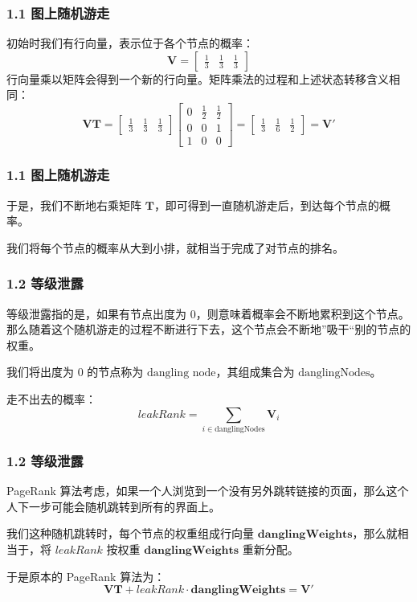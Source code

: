 \documentclass{beamer}
\begin{document}
\begin{frame}
	\frametitle{1.1 图上随机游走}
	初始时我们有行向量，表示位于各个节点的概率：
	\[
	\mathbf{V} = \begin{bmatrix}
		\frac{1}{3} & \frac{1}{3} & \frac{1}{3}
	\end{bmatrix}
	\]
	\pause
	行向量乘以矩阵会得到一个新的行向量。矩阵乘法的过程和上述状态转移含义相同：
	\[
	\mathbf{V}\mathbf{T}=
	\begin{bmatrix}
		\frac{1}{3} & \frac{1}{3} & \frac{1}{3}
	\end{bmatrix}
	\begin{bmatrix}
		0 & \frac{1}{2} & \frac{1}{2} \\
		0 & 0 & 1 \\
		1 & 0 & 0
	\end{bmatrix}
	= 
	\begin{bmatrix}
		\frac{1}{3} & \frac{1}{6} & \frac{1}{2}
	\end{bmatrix}
	=\mathbf{V}'
	\]
\end{frame}

\begin{frame}
	\frametitle{1.1 图上随机游走}
	于是，我们不断地右乘矩阵 \(\mathbf{T}\)，即可得到一直随机游走后，到达每个节点的概率。
	
	\pause
	
	我们将每个节点的概率从大到小排，就相当于完成了对节点的排名。
\end{frame}

\begin{frame}
	\frametitle{1.2 等级泄露}
	等级泄露指的是，如果有节点出度为 \(0\)，则意味着概率会不断地累积到这个节点。那么随着这个随机游走的过程不断进行下去，这个节点会不断地”吸干“别的节点的权重。
	
	\pause
	
	我们将出度为 \(0\) 的节点称为 \(\text{dangling node}\)，其组成集合为 \(\text{danglingNodes}\)。
	
	\pause
	
	走不出去的概率：
	\[
	leakRank = \sum_{i\in \text{danglingNodes}}{\mathbf{V}_i}
	\]
\end{frame}

\begin{frame}
	\frametitle{1.2 等级泄露}
	PageRank 算法考虑，如果一个人浏览到一个没有另外跳转链接的页面，那么这个人下一步可能会随机跳转到所有的界面上。
	
	\pause

	我们这种随机跳转时，每个节点的权重组成行向量 \(\mathbf{danglingWeights}\)，那么就相当于，将 \(leakRank\) 按权重 \(\mathbf{danglingWeights}\) 重新分配。
	
	\pause

	于是原本的 PageRank 算法为：
	\[
	\mathbf{V}\mathbf{T} + leakRank \cdot \mathbf{danglingWeights} = \mathbf{V}'
	\]
\end{frame}
\end{document}
